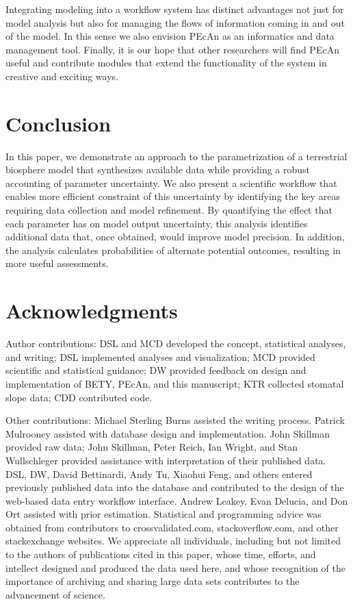 \documentclass[12pt]{article}
\begin{document}
\begin{flushleft}
\begin{spacing}{1.9}
 Integrating modeling into a workflow system has distinct advantages not just for model analysis but also for managing the flows of information coming in and out of the model. 
 In this sense we also envision PEcAn as an informatics and data management tool.  
 Finally, it is our hope that other researchers will find PEcAn useful and contribute modules that extend the functionality of the system in creative and exciting ways.


\section*{Conclusion}\label{sec:conclusion}

 In this paper, we demonstrate an approach to the parametrization of a terrestrial biosphere model that synthesizes available data while providing a robust accounting of parameter uncertainty. 
  We also present a scientific workflow that enables more efficient constraint of this uncertainty by identifying the key areas requiring data collection and model refinement.
 By quantifying the effect that each parameter has on model output uncertainty, this analysis identifies additional data that, once obtained, would improve model precision.
 In addition, the analysis calculates probabilities of alternate potential outcomes, resulting in more useful assessments.


\section*{Acknowledgments}
Author contributions: DSL and MCD developed the concept, statistical analyses, and writing; DSL implemented analyses and visualization; MCD provided scientific and statistical guidance; DW provided feedback on design and implementation of BETY, PEcAn, and this manuscript; KTR collected stomatal slope data; CDD contributed code.


Other contributions: Michael Sterling Burns assisted the writing process.
Patrick Mulrooney assisted with database design and implementation.
John Skillman provided raw data; John Skillman, Peter Reich, Ian Wright, and Stan Wullschleger provided assistance with interpretation of their published data.
DSL, DW, David Bettinardi, Andy Tu, Xiaohui Feng, and others entered previously published data into the database and contributed to the design of the web-based data entry workflow interface.
Andrew Leakey, Evan Delucia, and Don Ort assisted with prior estimation.
Statistical and programming advice was obtained from contributors to crossvalidated.com, stackoverflow.com, and other stackexchange websites.
We appreciate all individuals, including but not limited to the authors of publications cited  in this paper, whose time, efforts, and intellect designed and produced the data used here, and whose recognition of the importance of archiving and sharing large data sets contributes to the advancement of science.


\end{spacing}
\end{flushleft}
\end{document}
